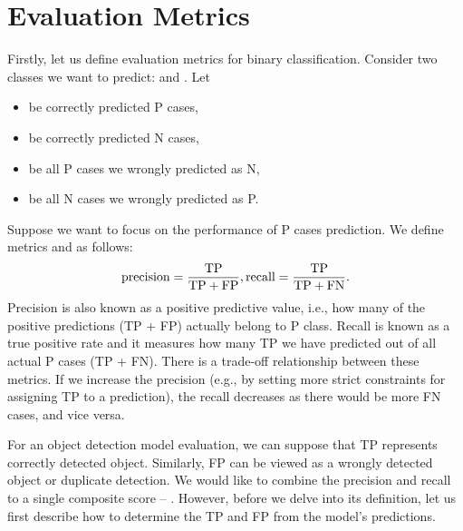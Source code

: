 
\section{Evaluation Metrics}
Firstly, let us define evaluation metrics for binary classification. Consider two classes we want to predict:  and . Let
\begin{itemize}
    \item {} be correctly predicted P cases,
    \item {} be correctly predicted N cases,
    \item {} be all P cases we wrongly predicted as N,
    \item {} be all N cases we wrongly predicted as P.
\end{itemize}
Suppose we want to focus on the performance of P cases prediction. We define metrics  and  as follows:
$$
    \text{precision} = \frac{\text{TP}}{\text{TP} + \text{FP}}, \\
    \text{recall} = \frac{\text{TP}}{\text{TP} + \text{FN}}.
$$
Precision is also known as a positive predictive value, i.e., how many of the positive predictions (TP + FP) actually belong to P class. Recall is known as a true positive rate and it measures how many TP we have predicted out of all actual P cases (TP + FN). There is a trade-off relationship between these metrics. If we increase the precision (e.g., by setting more strict constraints for assigning TP to a prediction), the recall decreases as there would be more FN cases, and vice versa. 

For an object detection model evaluation, we can suppose that TP represents correctly detected object. Similarly, FP can be viewed as a wrongly detected object or duplicate detection. We would like to combine the precision and recall to a single composite score -- . However, before we delve into its definition, let us first describe how to determine the TP and FP from the model's predictions.

